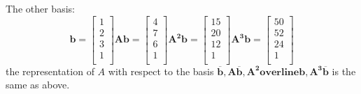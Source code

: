 \documentclass{article}
\begin{document}
The other basis:
\begin{equation*}
\boldsymbol{b}=
\left[
\begin{array}{c}
1\\
2\\
3\\
1\\
\end{array}
\right]
\boldsymbol{Ab}=
\left[
\begin{array}{c}
4\\
7\\
6\\
1\\
\end{array}
\right]
\boldsymbol{A^2b}=
\left[
\begin{array}{c}
15\\
20\\
12\\
1\\
\end{array}
\right]
\boldsymbol{A^3b}=
\left[
\begin{array}{c}
50\\
52\\
24\\
1\\
\end{array}
\right]
\end{equation*}
the representation of $A$ with respect to the basis {$\boldsymbol{\overline{b}},\boldsymbol{A\overline{b}},\boldsymbol{A^2overline{b}},\boldsymbol{A^3\overline{b}}$}
is the same as above.
\end{document}
